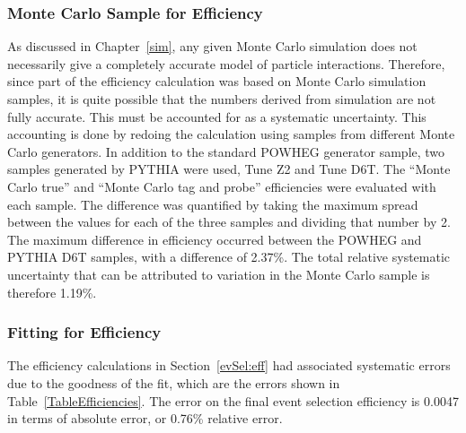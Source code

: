 \subsubsection{Monte Carlo Sample for Efficiency}
\label{anMeth:SystsOtherMCEff}


As discussed in Chapter~\ref{sim}, 
any given Monte Carlo simulation 
does not necessarily give a completely accurate 
model of particle interactions.  %
Therefore, since part of the efficiency calculation 
was based on Monte Carlo simulation samples, 
it is quite possible that the numbers 
derived from simulation are not fully 
accurate.  
This must be accounted for as a systematic 
uncertainty.  
This accounting is done by 
redoing the calculation using samples 
from different Monte Carlo generators.  
In addition to the standard POWHEG generator 
sample, 
two samples generated by PYTHIA were used, 
Tune Z2 and Tune D6T.  
The ``Monte Carlo true'' and ``Monte Carlo tag and probe'' 
efficiencies were evaluated with each sample.  
The difference was quantified by taking the 
maximum spread between the values for each of the 
three samples 
and dividing that number by 2.  
The maximum difference in efficiency occurred 
between the POWHEG and PYTHIA D6T samples, 
with a difference of 2.37\%.  
The total relative systematic uncertainty that can be 
attributed to variation in the Monte Carlo 
sample is therefore 1.19\%.  



\subsubsection{Fitting for Efficiency}
\label{anMeth:SystsOtherFitEff}


The efficiency calculations in Section~\ref{evSel:eff} 
had associated systematic errors due to the 
goodness of the fit, 
which are the errors shown in Table~\ref{TableEfficiencies}.  
The error on the final event selection 
efficiency is 0.0047 in terms of absolute error, 
or 0.76\% relative error.  


